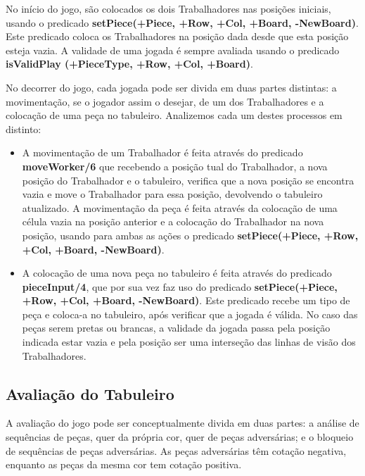 \documentclass[a4paper]{article}
\begin{document}
No início do jogo, são colocados os dois Trabalhadores nas posições iniciais, usando o predicado \textbf{setPiece(+Piece, +Row, +Col, +Board, -NewBoard)}. Este predicado coloca os Trabalhadores na posição dada desde que esta posição esteja vazia. A validade de uma jogada é sempre avaliada usando o predicado \textbf{isValidPlay (+PieceType, +Row, +Col, +Board)}.

No decorrer do jogo, cada jogada pode ser divida em duas partes distintas:  a movimentação, se o jogador assim o desejar, de um dos Trabalhadores e a colocação de uma peça no tabuleiro. Analizemos cada um destes processos em distinto:
\begin{itemize}
	\item A movimentação de um Trabalhador é feita através do predicado \textbf{moveWorker/6} que recebendo a posição tual do Trabalhador, a nova posição do Trabalhador e o tabuleiro, verifica que a nova posição se encontra vazia e move o Trabalhador para essa posição, devolvendo o tabuleiro atualizado. A movimentação da peça é feita através da colocação de uma célula vazia na posição anterior e a colocação do Trabalhador na nova posição, usando para ambas as ações o predicado \textbf {setPiece(+Piece, +Row, +Col, +Board, -NewBoard)}.
	\item A colocação de uma nova peça no tabuleiro é feita através do predicado \textbf{pieceInput/4}, que por sua vez faz uso do predicado \textbf{setPiece(+Piece, +Row, +Col, +Board, -NewBoard)}. Este predicado recebe um tipo de peça e coloca-a no tabuleiro, após verificar que a jogada é válida. No caso das peças serem pretas ou brancas, a validade da jogada passa pela posição indicada estar vazia e pela posição ser uma interseção das linhas de visão dos Trabalhadores.
\end {itemize}

\newpage

\subsection{Avaliação do Tabuleiro}

A avaliação do jogo pode ser conceptualmente divida em duas partes: a análise de sequências de peças, quer da própria cor, quer de peças adversárias; e o bloqueio de sequências de peças adversárias. As peças adversárias têm cotação negativa, enquanto as peças da mesma cor tem cotação positiva.
\end{document}
